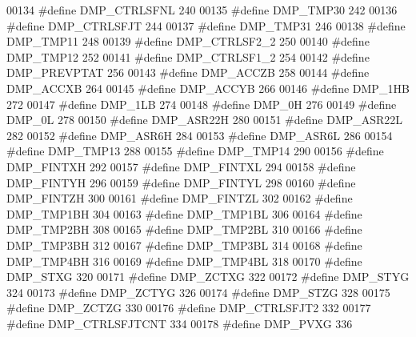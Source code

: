 \begin{DoxyCode}
00134 \textcolor{preprocessor}{#define DMP\_CTRLSFNL    240}
00135 \textcolor{preprocessor}{#define DMP\_TMP30    242}
00136 \textcolor{preprocessor}{#define DMP\_CTRLSFJT    244}
00137 \textcolor{preprocessor}{#define DMP\_TMP31    246}
00138 \textcolor{preprocessor}{#define DMP\_TMP11    248}
00139 \textcolor{preprocessor}{#define DMP\_CTRLSF2\_2    250}
00140 \textcolor{preprocessor}{#define DMP\_TMP12    252}
00141 \textcolor{preprocessor}{#define DMP\_CTRLSF1\_2    254}
00142 \textcolor{preprocessor}{#define DMP\_PREVPTAT    256}
00143 \textcolor{preprocessor}{#define DMP\_ACCZB    258}
00144 \textcolor{preprocessor}{#define DMP\_ACCXB    264}
00145 \textcolor{preprocessor}{#define DMP\_ACCYB    266}
00146 \textcolor{preprocessor}{#define DMP\_1HB    272}
00147 \textcolor{preprocessor}{#define DMP\_1LB    274}
00148 \textcolor{preprocessor}{#define DMP\_0H    276}
00149 \textcolor{preprocessor}{#define DMP\_0L    278}
00150 \textcolor{preprocessor}{#define DMP\_ASR22H    280}
00151 \textcolor{preprocessor}{#define DMP\_ASR22L    282}
00152 \textcolor{preprocessor}{#define DMP\_ASR6H    284}
00153 \textcolor{preprocessor}{#define DMP\_ASR6L    286}
00154 \textcolor{preprocessor}{#define DMP\_TMP13    288}
00155 \textcolor{preprocessor}{#define DMP\_TMP14    290}
00156 \textcolor{preprocessor}{#define DMP\_FINTXH    292}
00157 \textcolor{preprocessor}{#define DMP\_FINTXL    294}
00158 \textcolor{preprocessor}{#define DMP\_FINTYH    296}
00159 \textcolor{preprocessor}{#define DMP\_FINTYL    298}
00160 \textcolor{preprocessor}{#define DMP\_FINTZH    300}
00161 \textcolor{preprocessor}{#define DMP\_FINTZL    302}
00162 \textcolor{preprocessor}{#define DMP\_TMP1BH    304}
00163 \textcolor{preprocessor}{#define DMP\_TMP1BL    306}
00164 \textcolor{preprocessor}{#define DMP\_TMP2BH    308}
00165 \textcolor{preprocessor}{#define DMP\_TMP2BL    310}
00166 \textcolor{preprocessor}{#define DMP\_TMP3BH    312}
00167 \textcolor{preprocessor}{#define DMP\_TMP3BL    314}
00168 \textcolor{preprocessor}{#define DMP\_TMP4BH    316}
00169 \textcolor{preprocessor}{#define DMP\_TMP4BL    318}
00170 \textcolor{preprocessor}{#define DMP\_STXG    320}
00171 \textcolor{preprocessor}{#define DMP\_ZCTXG    322}
00172 \textcolor{preprocessor}{#define DMP\_STYG    324}
00173 \textcolor{preprocessor}{#define DMP\_ZCTYG    326}
00174 \textcolor{preprocessor}{#define DMP\_STZG    328}
00175 \textcolor{preprocessor}{#define DMP\_ZCTZG    330}
00176 \textcolor{preprocessor}{#define DMP\_CTRLSFJT2    332}
00177 \textcolor{preprocessor}{#define DMP\_CTRLSFJTCNT    334}
00178 \textcolor{preprocessor}{#define DMP\_PVXG    336}

\end{DoxyCode}
